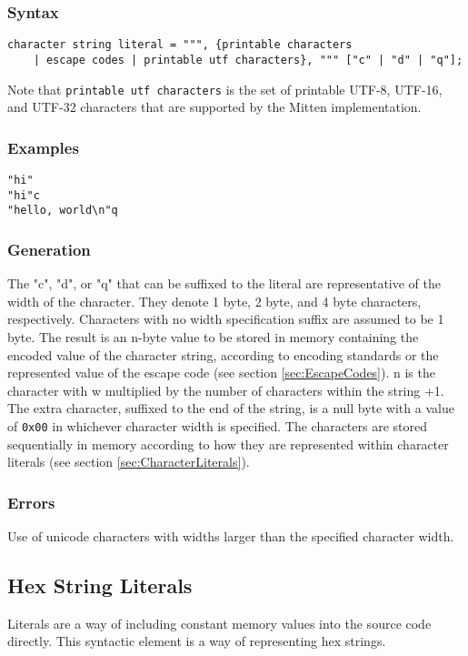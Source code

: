 \documentclass[10pt,a4paper]{article}
\begin{document}
\subsubsection{Syntax}
\begin{verbatim}
character string literal = """, {printable characters
    | escape codes | printable utf characters}, """ ["c" | "d" | "q"];
\end{verbatim}

Note that \verb|printable utf characters| is the set of printable UTF-8, UTF-16, and UTF-32 characters that are supported by the Mitten implementation. 

\subsubsection{Examples}
\begin{verbatim}
"hi"
"hi"c
"hello, world\n"q
\end{verbatim}

\subsubsection{Generation}
The "c", "d", or "q" that can be suffixed to the literal are representative of the width of the character. They denote 1 byte, 2 byte, and 4 byte characters, respectively. Characters with no width specification suffix are assumed to be 1 byte. The result is an n-byte value to be stored in memory containing the encoded value of the character string, according to encoding standards or the represented value of the escape code (see section \ref{sec:EscapeCodes}). n is the character with w multiplied by the number of characters within the string +1. The extra character, suffixed to the end of the string, is a null byte with a value of \verb|0x00| in whichever character width is specified. The characters are stored sequentially in memory according to how they are represented within character literals (see section \ref{sec:CharacterLiterals}).

\subsubsection{Errors}
Use of unicode characters with widths larger than the specified character width.

\newpage




\subsection{Hex String Literals}
\label{sec:HexStringLiterals}
Literals are a way of including constant memory values into the source code directly. This syntactic element is a way of representing hex strings.
\end{document}
